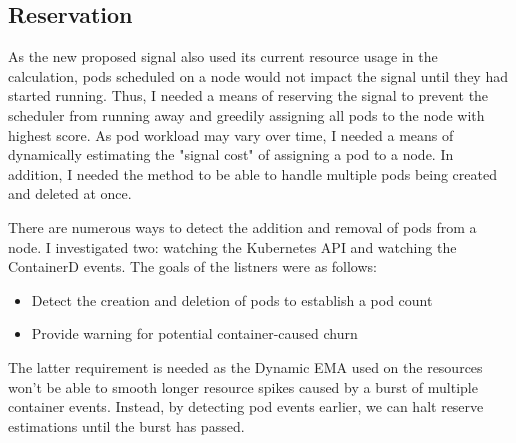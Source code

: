 \subsection{Reservation}
As the new proposed signal also used its current resource usage in the
calculation, pods scheduled on a node would not impact the signal until they had
started running. Thus, I needed a means of reserving the signal to prevent the
scheduler from running away and greedily assigning all pods to the node with
highest score. As pod workload may vary over time, I needed a means of
dynamically estimating the "signal cost" of assigning a pod to a node. In
addition, I needed the method to be able to handle multiple pods being created
and deleted at once.

There are numerous ways to detect the addition and removal of pods from a node.
I investigated two: watching the Kubernetes API and watching the ContainerD
events. The goals of the listners were as follows:
\begin{itemize}
    \item Detect the creation and deletion of pods to establish a pod count
    \item Provide warning for potential container-caused churn
\end{itemize}
The latter requirement is needed as the Dynamic EMA used on the resources won't
be able to smooth longer resource spikes caused by a burst of multiple container
events. Instead, by detecting pod events earlier, we can halt reserve
estimations until the burst has passed.

